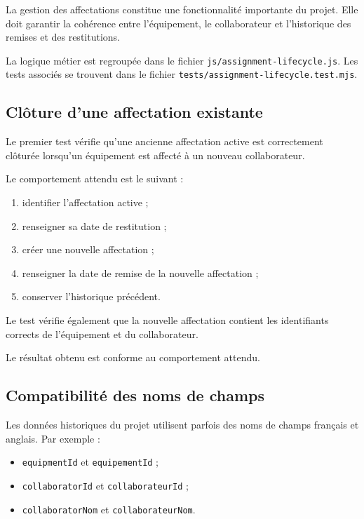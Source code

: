 \documentclass{rapportENSIAS}
\begin{document}
La gestion des affectations constitue une fonctionnalité importante du projet. Elle doit garantir la cohérence entre l’équipement, le collaborateur et l’historique des remises et des restitutions.

La logique métier est regroupée dans le fichier \texttt{js/assignment-lifecycle.js}. Les tests associés se trouvent dans le fichier \texttt{tests/assignment-lifecycle.test.mjs}.

\subsection{Clôture d’une affectation existante}

Le premier test vérifie qu’une ancienne affectation active est correctement clôturée lorsqu’un équipement est affecté à un nouveau collaborateur.

Le comportement attendu est le suivant :

\begin{enumerate}
    \item identifier l’affectation active ;
    \item renseigner sa date de restitution ;
    \item créer une nouvelle affectation ;
    \item renseigner la date de remise de la nouvelle affectation ;
    \item conserver l’historique précédent.
\end{enumerate}

Le test vérifie également que la nouvelle affectation contient les identifiants corrects de l’équipement et du collaborateur.

Le résultat obtenu est conforme au comportement attendu.

\subsection{Compatibilité des noms de champs}

Les données historiques du projet utilisent parfois des noms de champs français et anglais. Par exemple :

\begin{itemize}
    \item \texttt{equipmentId} et \texttt{equipementId} ;
    \item \texttt{collaboratorId} et \texttt{collaborateurId} ;
    \item \texttt{collaboratorNom} et \texttt{collaborateurNom}.
\end{itemize}
\end{document}
